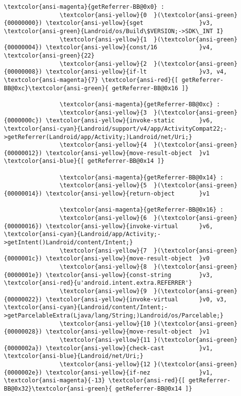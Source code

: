 \documentclass{article}
\begin{document}
			    
			    \begin{Verbatim}[commandchars=\\\{\}]
			    \textcolor{ansi-magenta}{getReferrer-BB@0x0} : 
			    \textcolor{ansi-yellow}{0  }(\textcolor{ansi-green}{00000000}) \textcolor{ansi-yellow}{sget                }v3, \textcolor{ansi-green}{Landroid/os/Build\$VERSION;->SDK\_INT I}
			    \textcolor{ansi-yellow}{1  }(\textcolor{ansi-green}{00000004}) \textcolor{ansi-yellow}{const/16            }v4, \textcolor{ansi-green}{22}
			    \textcolor{ansi-yellow}{2  }(\textcolor{ansi-green}{00000008}) \textcolor{ansi-yellow}{if-lt               }v3, v4, \textcolor{ansi-magenta}{7} \textcolor{ansi-red}{[ getReferrer-BB@0xc}\textcolor{ansi-green}{ getReferrer-BB@0x16 ]}
			    
			    \textcolor{ansi-magenta}{getReferrer-BB@0xc} : 
			    \textcolor{ansi-yellow}{3  }(\textcolor{ansi-green}{0000000c}) \textcolor{ansi-yellow}{invoke-static       }v6, \textcolor{ansi-cyan}{Landroid/support/v4/app/ActivityCompat22;->getReferrer(Landroid/app/Activity;)Landroid/net/Uri;}
			    \textcolor{ansi-yellow}{4  }(\textcolor{ansi-green}{00000012}) \textcolor{ansi-yellow}{move-result-object  }v1 \textcolor{ansi-blue}{[ getReferrer-BB@0x14 ]}
			    
			    \textcolor{ansi-magenta}{getReferrer-BB@0x14} : 
			    \textcolor{ansi-yellow}{5  }(\textcolor{ansi-green}{00000014}) \textcolor{ansi-yellow}{return-object       }v1
			    
			    \textcolor{ansi-magenta}{getReferrer-BB@0x16} : 
			    \textcolor{ansi-yellow}{6  }(\textcolor{ansi-green}{00000016}) \textcolor{ansi-yellow}{invoke-virtual      }v6, \textcolor{ansi-cyan}{Landroid/app/Activity;->getIntent()Landroid/content/Intent;}
			    \textcolor{ansi-yellow}{7  }(\textcolor{ansi-green}{0000001c}) \textcolor{ansi-yellow}{move-result-object  }v0
			    \textcolor{ansi-yellow}{8  }(\textcolor{ansi-green}{0000001e}) \textcolor{ansi-yellow}{const-string        }v3, \textcolor{ansi-red}{u'android.intent.extra.REFERRER'}
			    \textcolor{ansi-yellow}{9  }(\textcolor{ansi-green}{00000022}) \textcolor{ansi-yellow}{invoke-virtual      }v0, v3, \textcolor{ansi-cyan}{Landroid/content/Intent;->getParcelableExtra(Ljava/lang/String;)Landroid/os/Parcelable;}
			    \textcolor{ansi-yellow}{10 }(\textcolor{ansi-green}{00000028}) \textcolor{ansi-yellow}{move-result-object  }v1
			    \textcolor{ansi-yellow}{11 }(\textcolor{ansi-green}{0000002a}) \textcolor{ansi-yellow}{check-cast          }v1, \textcolor{ansi-blue}{Landroid/net/Uri;}
			    \textcolor{ansi-yellow}{12 }(\textcolor{ansi-green}{0000002e}) \textcolor{ansi-yellow}{if-nez              }v1, \textcolor{ansi-magenta}{-13} \textcolor{ansi-red}{[ getReferrer-BB@0x32}\textcolor{ansi-green}{ getReferrer-BB@0x14 ]}
			    

\end{Verbatim}
\end{document}
